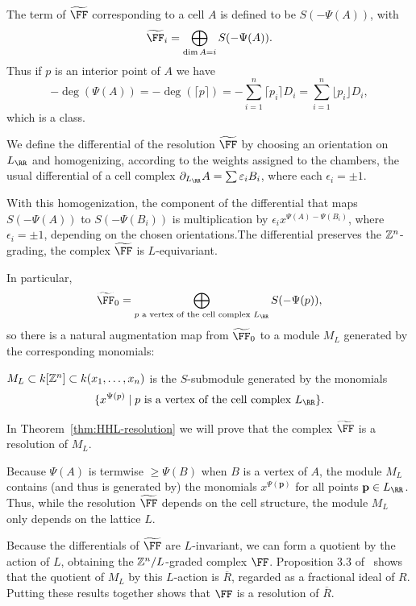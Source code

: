 \documentclass{amsart}
\begin{document}
\begin{defn}\label{def of F}
 The term of $\tF$ corresponding to a cell $A$ is defined to be $S(-\Psi(A))$, with  
 \[
    \tF_i=\bigoplus_{\dim A=i}S(-\Psi(A)).
   \]
Thus if $p$ is an interior point of $A$
we have
\[
-\deg(\Psi(A)) = -\deg( \lceil {p}\rceil) = -\sum_{i=1}^n\lceil p_i\rceil D_i=\sum_{i=1}^n\lfloor p_i\rfloor D_i,
\] 
which is a \BT class.

 We define the differential of the resolution $\tF$ by choosing
an orientation on $L_\RR$ and homogenizing, according to the weights assigned to the chambers, the usual differential of
a cell complex $\partial_{L_{\RR}}A = \sum\epsilon_{i}B_{i}$, where each $\epsilon_{i} = \pm 1$.
\end{defn}

With this homogenization, the component of the differential that maps $S(-\Psi(A))$ to $S(-\Psi(B_{i}))$ is multiplication by $\epsilon_{i}x^{\Psi(A) - \Psi(B_{i})}$, where
$\epsilon_{i} = \pm 1$, depending on the chosen orientations.The
differential preserves the $\mathbb Z^{n}$-grading, the complex $\tF$ is $L$-equivariant.



In particular,
$$
\tF_{0} = \bigoplus_{p \text{ a vertex of the cell complex }L_{\RR}}S(-\Psi(p)),
$$
so there is a natural augmentation map from $\tF_{0}$ to a module $M_{L}$ generated by the corresponding monomials:

\begin{defn}\label{def:M_{L}}
 $M_{L}\subset k[\mathbb Z^{n}]\subset k(x_{1}, \dots, x_{n})$ is the $S$-submodule generated by the monomials
 $$
 \{x^{\Psi(p)} \mid p \hbox{ is a vertex of the cell complex }L_{\RR}\}.
 $$
\end{defn}


In Theorem~\ref{thm:HHL-resolution} we will prove that the complex $\tF$ is a resolution of $M_L$.

\begin{remark}
 Because $\Psi(A)$ is termwise $\geq \Psi(B)$ when $B$ is a vertex of $A$, the module $M_{L}$ contains (and thus is generated by) the monomials $x^{\Psi(\mathbf{p})}$ for all points $\mathbf{p}\in L_{\RR}$. Thus, while the resolution $\tF$ depends on the cell structure, the module $M_L$ only depends on the lattice $L$.
\end{remark}

Because the differentials of $\tF$ are $L$-invariant, we can form a quotient by the action of $L$, obtaining the $\mathbb Z^{n}/L$-graded complex $\FF$. Proposition 3.3 of~\cite{BCHSY} shows  that the quotient of $M_L$ by this $L$-action is $\overline{R}$, regarded as a fractional ideal of $R$. Putting these results together shows that  $\FF$ is a resolution of $\overline R$.
\end{document}
